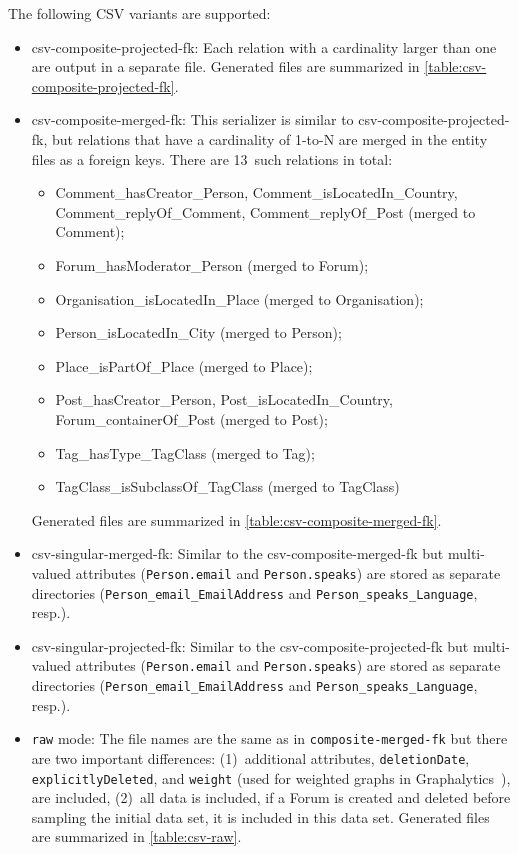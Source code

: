The following CSV variants are supported:
    \begin{itemize}
      \item \textsf{csv-composite-projected-fk:}
      Each relation with a cardinality larger than one are output in a separate file.
      Generated files are summarized in \autoref{table:csv-composite-projected-fk}.

      \item \textsf{csv-composite-merged-fk:}
      This serializer is similar to \textsf{csv-composite-projected-fk}, but relations that have a cardinality of 1-to-N are merged in the entity files as a foreign keys.
      There are 13~such relations in total:
      \begin{itemize}
        \item Comment\_hasCreator\_Person, Comment\_isLocatedIn\_Country, Comment\_replyOf\_Comment, Comment\_replyOf\_Post (merged to Comment);
        \item Forum\_hasModerator\_Person (merged to Forum);
        \item Organisation\_isLocatedIn\_Place (merged to Organisation);
        \item Person\_isLocatedIn\_City (merged to Person);
        \item Place\_isPartOf\_Place (merged to Place);
        \item Post\_hasCreator\_Person, Post\_isLocatedIn\_Country, Forum\_containerOf\_Post (merged to Post);
        \item Tag\_hasType\_TagClass (merged to Tag);
        \item TagClass\_isSubclassOf\_TagClass (merged to TagClass)
      \end{itemize}
      Generated files are summarized in \autoref{table:csv-composite-merged-fk}.
    
      \item \textsf{csv-singular-merged-fk}:
      Similar to the \textsf{csv-composite-merged-fk} but multi-valued attributes (\texttt{Person.email} and \texttt{Person.speaks}) are stored as separate directories (\texttt{Person\_email\_EmailAddress} and \texttt{Person\_speaks\_Language}, resp.).
    
      \item \textsf{csv-singular-projected-fk}:
      Similar to the \textsf{csv-composite-projected-fk} but multi-valued attributes (\texttt{Person.email} and \texttt{Person.speaks}) are stored as separate directories (\texttt{Person\_email\_EmailAddress} and \texttt{Person\_speaks\_Language}, resp.).

      \item \texttt{raw} mode:
      The file names are the same as in \texttt{composite-merged-fk} but there are two important differences:
      (1)~additional attributes, \eg \texttt{deletionDate}, \texttt{explicitlyDeleted}, and \texttt{weight} (used for weighted graphs in Graphalytics~\cite{DBLP:journals/corr/abs-2011-15028}), are included,
      (2)~all data is included, \ie if a Forum is created and deleted before sampling the initial data set, it is included in this data set.
      Generated files are summarized in \autoref{table:csv-raw}.
    \end{itemize}

